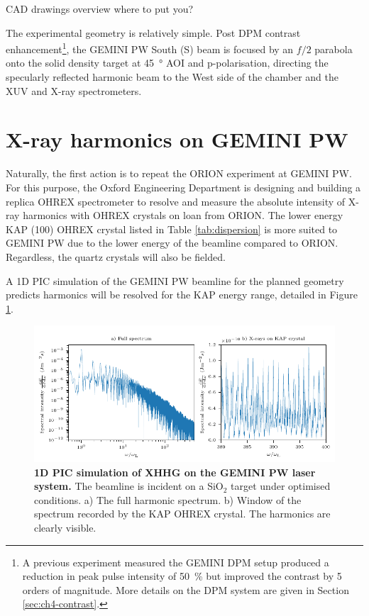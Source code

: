 

CAD drawings overview where to put you?

The experimental geometry is relatively simple. Post \ac{DPM} contrast enhancement\footnote{A previous experiment measured the GEMINI DPM setup produced a reduction in peak pulse intensity of \qty{50}{\%} but improved the contrast by 5 orders of magnitude. More details on the DPM system are given in Section \ref{sec:ch4-contrast}.}, the GEMINI PW South (S) beam is focused by an $f/2$ parabola onto the solid density target at \qty{45}{\degree} \ac{AOI} and p-polarisation, directing the specularly reflected harmonic beam to the West side of the chamber and the XUV and X-ray spectrometers.

\section{X-ray harmonics on GEMINI PW}\label{sec:ch4-xray}
Naturally, the first action is to repeat the ORION experiment at GEMINI PW. For this purpose, the Oxford Engineering Department is designing and building a replica OHREX spectrometer to resolve and measure the absolute intensity of X-ray harmonics with OHREX crystals on loan from ORION. The lower energy KAP (100) OHREX crystal listed in Table \ref{tab:dispersion} is more suited to GEMINI PW due to the lower energy of the beamline compared to ORION. Regardless, the quartz crystals will also be fielded. 

A 1D PIC simulation of the GEMINI PW beamline for the planned geometry predicts harmonics will be resolved for the KAP energy range, detailed in Figure \ref{fig:geminixrayharmonics}.
\begin{figure}
	\centering
	\includegraphics{figures/gemini/gemini_xray_harmonics}
	\caption[XHHG on the GEMINI PW laser system.]{\textbf{1D PIC simulation of XHHG on the GEMINI PW laser system.} The beamline is incident on a SiO$_2$ target under optimised conditions. a) The full harmonic spectrum. b) Window of the spectrum recorded by the KAP OHREX crystal. The harmonics are clearly visible.}
	\label{fig:geminixrayharmonics}
\end{figure}

